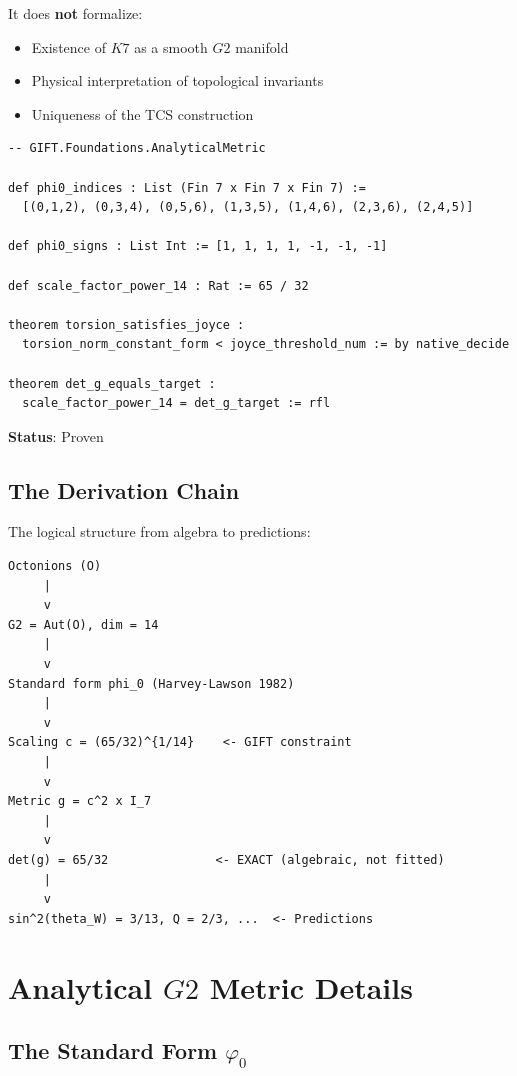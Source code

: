 \documentclass[11pt,a4paper]{article}
\newcommand{\Gtwo}{\mathrm{G}_2}
\newcommand{\Kseven}{K_7}
\newcommand{\proven}{\textsc{Proven}}
\def\Gtwo{G2}%
\def\Kseven{K7}%
\def\proven{Proven}%
\begin{document}
It does \textbf{not} formalize:
\begin{itemize}
\item Existence of $\Kseven$ as a smooth $\Gtwo$ manifold
\item Physical interpretation of topological invariants
\item Uniqueness of the TCS construction
\end{itemize}

\begin{lstlisting}
-- GIFT.Foundations.AnalyticalMetric

def phi0_indices : List (Fin 7 x Fin 7 x Fin 7) :=
  [(0,1,2), (0,3,4), (0,5,6), (1,3,5), (1,4,6), (2,3,6), (2,4,5)]

def phi0_signs : List Int := [1, 1, 1, 1, -1, -1, -1]

def scale_factor_power_14 : Rat := 65 / 32

theorem torsion_satisfies_joyce :
  torsion_norm_constant_form < joyce_threshold_num := by native_decide

theorem det_g_equals_target :
  scale_factor_power_14 = det_g_target := rfl
\end{lstlisting}

\textbf{Status}: \proven{}

\subsection{The Derivation Chain}

The logical structure from algebra to predictions:

\begin{lstlisting}
Octonions (O)
     |
     v
G2 = Aut(O), dim = 14
     |
     v
Standard form phi_0 (Harvey-Lawson 1982)
     |
     v
Scaling c = (65/32)^{1/14}    <- GIFT constraint
     |
     v
Metric g = c^2 x I_7
     |
     v
det(g) = 65/32               <- EXACT (algebraic, not fitted)
     |
     v
sin^2(theta_W) = 3/13, Q = 2/3, ...  <- Predictions
\end{lstlisting}

\section{Analytical $\Gtwo$ Metric Details}

\subsection{The Standard Form $\varphi_0$}
\end{document}

